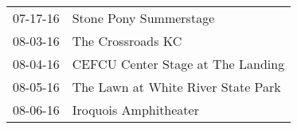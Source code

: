 \begin{supertabular}{p{0.07\textwidth}p{0.23\textwidth}}
 07-17-16 &              Stone Pony Summerstage \\
 08-03-16 &                   The Crossroads KC \\
 08-04-16 &   CEFCU Center Stage at The Landing \\
 08-05-16 &  The Lawn at White River State Park \\
 08-06-16 &               Iroquois Amphitheater \\
\end{supertabular}
